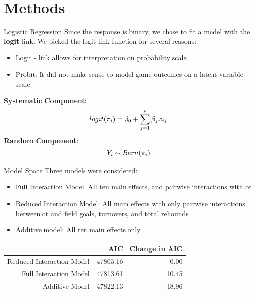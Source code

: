 \documentclass{beamer}
\begin{document}
	
	\section{Methods}
	
	\begin{frame}[t]{Logistic Regression}
	Since the response is binary, we chose to fit a model with the \textbf{logit} link. We picked the logit link function for several reasons: 
	\begin{itemize}
		\item Logit - link allows for interpretation on probability scale
		\item Probit: It did not make sense to model game outcomes on a latent variable scale
		
	\end{itemize}
\textbf{Systematic Component}: 
\begin{eqnarray} \label{eq:logit}
\centering
logit(\pi_{i})=\beta_{0}+\sum_{j=1}^{p} \beta_{j}x_{ij}
\end{eqnarray} 
\textbf{Random Component}: 
\begin{equation}
\centering
Y_i \sim Bern(\pi_i)
\end{equation}
	\end{frame}
	

\begin{frame}{Model Space}
Three models were considered:
\begin{itemize}
	\item Full Interaction Model: All ten main effects, and pairwise interactions with ot
	\item Reduced Interaction Model: All main effects with only pairwise interactions between ot and field goals, turnovers, and total rebounds
	\item Additive model: All ten main effects only
\end{itemize}
\begin{table}[h]
	\centering
	\begin{tabular}{rrr}
		\hline
		& AIC & Change in AIC \\ 
		\hline
		Reduced Interaction Model & 47803.16 & 0.00 \\ 
		Full Interaction Model & 47813.61 & 10.45 \\ 
		Additive Model & 47822.13 & 18.96 \\ 
		\hline
	\end{tabular}
\end{table}
\end{frame}	
	
\end{document}
